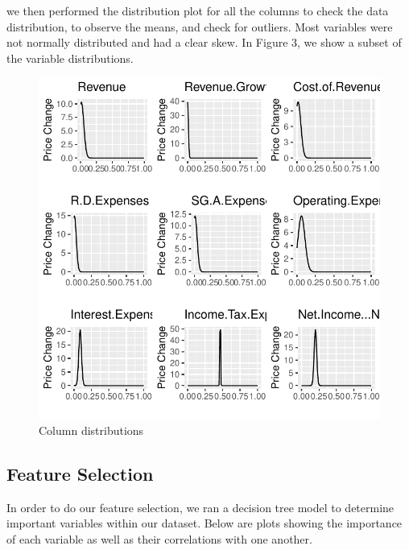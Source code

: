 \documentclass[11pt,]{article}
\begin{document}
we then performed the distribution plot for all the columns to check the
data distribution, to observe the means, and check for outliers. Most
variables were not normally distributed and had a clear skew. In Figure
3, we show a subset of the variable distributions.

\begin{figure}

{\centering \includegraphics{stock_analysis_files/figure-latex/data normal distribution plot1-1} 

}

\caption{Column distributions}\label{fig:data normal distribution plot1}
\end{figure}

\hypertarget{feature-selection-1}{%
\subsection{Feature Selection}\label{feature-selection-1}}

In order to do our feature selection, we ran a decision tree model to
determine important variables within our dataset. Below are plots
showing the importance of each variable as well as their correlations
with one another.
\end{document}
